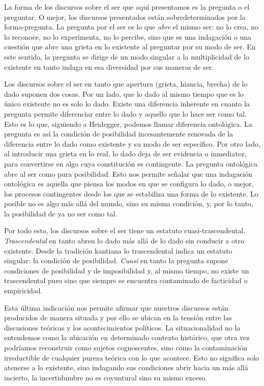 La forma de los discursos sobre el ser que aquí presentamos es la pregunta o el preguntar. O mejor, los discursos presentados están sobredeterminados por la forma-pregunta. La pregunta por el ser es lo que \emph{abre} el mismo ser: no lo crea, no lo reconoce, no lo experimenta, no lo percibe, sino que es una indagación o una cuestión que abre una grieta en lo existente al preguntar por su modo de ser. En este sentido, la pregunta se dirige de un modo singular a la multiplicidad de lo existente en tanto indaga en esa diversidad por sus maneras de ser.

Los discursos sobre el ser en tanto que apertura (grieta, hiancia, brecha) de lo dado suponen dos cosas. Por un lado, que lo dado al mismo tiempo que es lo único existente no es solo lo dado. Existe una diferencia inherente en cuanto la pregunta permite diferenciar entre lo dado y aquello que lo hace ser como tal. Esto es lo que, siguiendo a Heidegger, podemos llamar diferencia ontológica. La pregunta es así la condición de posibilidad incesantemente renovada de la diferencia entre lo dado como existente y su modo de ser específico. Por otro lado, al introducir una grieta en lo real, lo dado deja de ser evidencia o inmediatez, para convertirse en algo cuya constitución es contingente. La pregunta ontológica abre al ser como pura posibilidad. Esto nos permite señalar que una indagación ontológica es aquella que piensa los modos en que se configura lo dado, o mejor, los procesos contingentes desde los que se estabiliza una forma de lo existente. Lo posible no es algo más allá del mundo, sino su misma condición, y, por lo tanto, la posibilidad de ya no ser como tal.

Por todo esto, los discursos sobre el ser  tiene un estatuto cuasi-trascendental. \emph{Trascendental} en tanto abren lo dado más allá de lo dado sin conducir a otro existente. Desde la tradición kantiana lo trascendental indica un estatuto singular: la condición de posibilidad. \emph{Cuasi} en tanto la pregunta supone condiciones de posibilidad y de imposibilidad y, al mismo tiempo, no existe un trascendental puro sino que siempre se encuentra contaminado de facticidad o empiricidad.

Esta última indicación nos permite afirmar que nuestros discursos están producidos de manera situada y por ello se ubican en la tensión entre las discusiones teóricas y los acontecimientos políticos. La situacionalidad no la entendemos como la ubicación en determinado contexto histórico, que otra vez podríamos reconstruir como sujetos cognoscentes, sino como la contaminación irreductible de cualquier pureza teórica con lo que acontece. Esto no significa solo atenerse a lo existente, sino indagando sus condiciones abrir hacia un más allá incierto, la incertidumbre no es coyuntural sino su mismo exceso.

